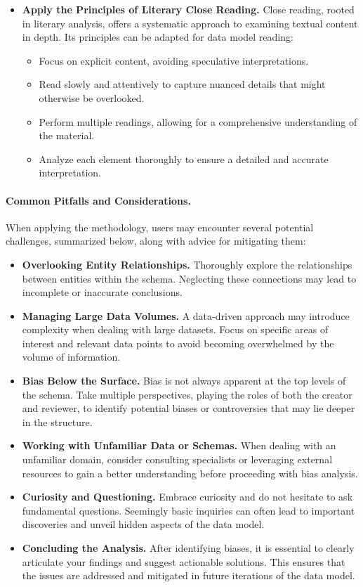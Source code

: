 \begin{itemize}
    \item \textbf{Apply the Principles of Literary Close Reading.}  Close reading, rooted in literary analysis, offers a systematic approach to examining textual content in depth. Its principles can be adapted for data model reading:
        \begin{itemize}
            \item Focus on explicit content, avoiding speculative interpretations.
            \item Read slowly and attentively to capture nuanced details that might otherwise be overlooked.
            \item Perform multiple readings, allowing for a comprehensive understanding of the material.
            \item Analyze each element thoroughly to ensure a detailed and accurate interpretation.
        \end{itemize}
    \end{itemize}
    
    \paragraph{Common Pitfalls and Considerations.} When applying the methodology, users may encounter several potential challenges, summarized below, along with advice for mitigating them:
    \begin{itemize} 
        \item \textbf{Overlooking Entity Relationships.}
        Thoroughly explore the relationships between entities within the schema. Neglecting these connections may lead to incomplete or inaccurate conclusions.
        \item \textbf{Managing Large Data Volumes.}  
        A data-driven approach may introduce complexity when dealing with large datasets. Focus on specific areas of interest and relevant data points to avoid becoming overwhelmed by the volume of information.
        \item \textbf{Bias Below the Surface.}  
        Bias is not always apparent at the top levels of the schema. Take multiple perspectives, playing the roles of both the creator and reviewer, to identify potential biases or controversies that may lie deeper in the structure.
        \item \textbf{Working with Unfamiliar Data or Schemas.}  
        When dealing with an unfamiliar domain, consider consulting specialists or leveraging external resources to gain a better understanding before proceeding with bias analysis.
        \item \textbf{Curiosity and Questioning.}  
        Embrace curiosity and do not hesitate to ask fundamental questions. Seemingly basic inquiries can often lead to important discoveries and unveil hidden aspects of the data model.
        \item \textbf{Concluding the Analysis.}  
        After identifying biases, it is essential to clearly articulate your findings and suggest actionable solutions. This ensures that the issues are addressed and mitigated in future iterations of the data model.

    \end{itemize}


